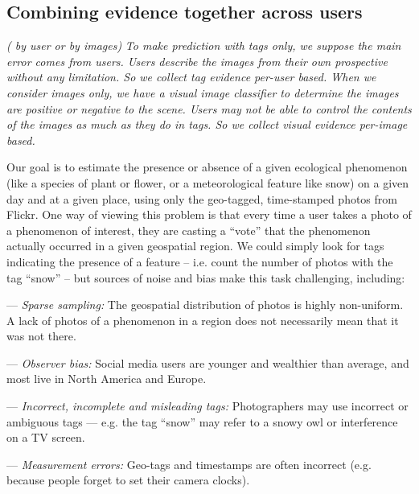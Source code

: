 \documentclass[10pt,journal,compsoc]{IEEEtran}
\begin{document}
\subsection{Combining evidence together across users}
\textit{( by user or by images)}
\textit{
To make prediction with tags only, we suppose the main error comes from users. Users describe the images from their own prospective without any limitation. So we collect tag evidence per-user based. When we consider images only, we have a visual image classifier to determine the images are positive or negative to the scene. Users may not be able to control the contents of the images as much as they do in tags. So we collect visual evidence per-image based.
}

Our goal is to estimate the presence or absence of a given ecological
phenomenon (like a species of plant or flower, or a meteorological
feature like snow) on a given day and at a given place,
using only the geo-tagged, time-stamped photos from Flickr. One way of viewing
this problem is that every time a user takes a photo of a phenomenon
of interest, they are casting a ``vote''  that the
phenomenon actually occurred in a given geospatial region. 
 We could
simply look for tags indicating the presence of a feature --
i.e. count the number of photos with the tag ``snow'' --  
but sources of noise and bias make this task 
challenging, including:
\begin{packed_itemize}
\item[---] \textit{Sparse sampling:} The geospatial distribution of photos
  is highly non-uniform. A lack of photos
  of a phenomenon in a region does not
  necessarily mean that it was not there. 
\item[---] \textit{Observer bias:} Social media users are younger and
  wealthier than average, and most live in North
  America and Europe.
\item[---] \textit{Incorrect, incomplete and misleading tags:}
  Photographers may use incorrect or ambiguous tags  ---
  e.g. the tag ``snow'' may refer to a snowy owl or interference on a
  TV screen.
\item[---] \textit{Measurement errors:} Geo-tags and timestamps are
  often incorrect (e.g. because people   forget to set their camera clocks).
\end{packed_itemize}
\end{document}
